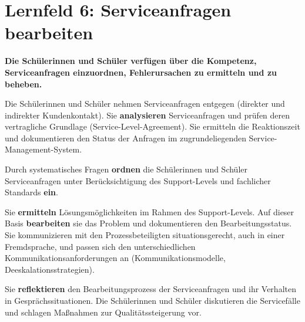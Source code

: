 \chapter{Lernfeld 6: Serviceanfragen bearbeiten}

\textbf{Die Schülerinnen und Schüler verfügen über die Kompetenz, Serviceanfragen einzuordnen, Fehlerursachen zu ermitteln und zu beheben.}

Die Schülerinnen und Schüler nehmen Serviceanfragen entgegen (direkter und indirekter
Kundenkontakt). Sie \textbf{analysieren} Serviceanfragen und prüfen deren vertragliche Grundlage
(Service-Level-Agreement). Sie ermitteln die Reaktionszeit und dokumentieren den Status
der Anfragen im zugrundeliegenden Service-Management-System.

Durch systematisches Fragen \textbf{ordnen} die Schülerinnen und Schüler Serviceanfragen unter
Berücksichtigung des Support-Levels und fachlicher Standards \textbf{ein}.

Sie \textbf{ermitteln} Lösungsmöglichkeiten im Rahmen des Support-Levels. Auf dieser Basis \textbf{bearbeiten} sie das Problem und dokumentieren den Bearbeitungsstatus. Sie kommunizieren
mit den Prozessbeteiligten situationsgerecht, auch in einer Fremdsprache, und passen sich
den unterschiedlichen Kommunikationsanforderungen an (Kommunikationsmodelle, Deeskalationsstrategien).

Sie \textbf{reflektieren} den Bearbeitungsprozess der Serviceanfragen und ihr Verhalten in Gesprächssituationen. Die Schülerinnen und Schüler diskutieren die Servicefälle und schlagen
Maßnahmen zur Qualitätssteigerung vor.

